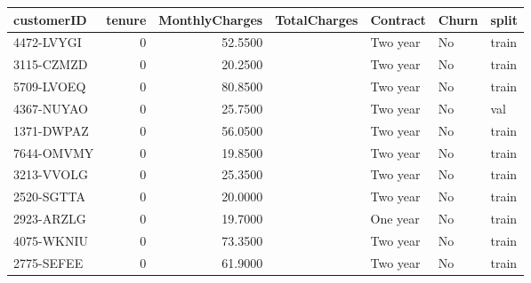 \begin{tabular}{lrrllll}
\toprule
customerID & tenure & MonthlyCharges & TotalCharges & Contract & Churn & split \\
\midrule
4472-LVYGI & 0 & 52.5500 &   & Two year & No & train \\
3115-CZMZD & 0 & 20.2500 &   & Two year & No & train \\
5709-LVOEQ & 0 & 80.8500 &   & Two year & No & train \\
4367-NUYAO & 0 & 25.7500 &   & Two year & No & val \\
1371-DWPAZ & 0 & 56.0500 &   & Two year & No & train \\
7644-OMVMY & 0 & 19.8500 &   & Two year & No & train \\
3213-VVOLG & 0 & 25.3500 &   & Two year & No & train \\
2520-SGTTA & 0 & 20.0000 &   & Two year & No & train \\
2923-ARZLG & 0 & 19.7000 &   & One year & No & train \\
4075-WKNIU & 0 & 73.3500 &   & Two year & No & train \\
2775-SEFEE & 0 & 61.9000 &   & Two year & No & train \\
\bottomrule
\end{tabular}
